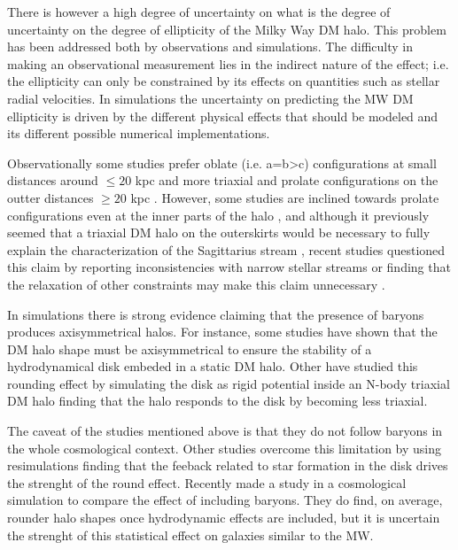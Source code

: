 \documentclass[a4paper,fleqn,usenatbib]{mnras}
\begin{document}
There is however a high degree of uncertainty on what is the degree of
uncertainty on the degree of ellipticity of the Milky Way DM halo.
This problem has been addressed both by observations and simulations.
The difficulty in making an observational measurement lies in the
indirect nature of the effect; i.e. the ellipticity can only be
constrained by its effects on quantities such as stellar radial
velocities.
In simulations the uncertainty on predicting the MW DM ellipticity is 
driven by the different physical effects that should be modeled and
its different possible numerical implementations.


Observationally some studies prefer oblate (i.e. a=b>c) configurations at small
distances around $\leq 20$ kpc
\citep[see][]{Law_and_Majewski_2010,Bovy_et_el._2016,Loebman_et_al._2012,Olling_and_Merrifield_2000,Banerjee_and_Chanda_2011} 
and more triaxial and prolate configurations on the outter distances
$\geq 20$ kpc 
\citep[see][]{Vera-Ciro_and_Helmi_2013,Law_and_Majewski_2009,Deg_and_Widrow_2013,Banerjee_and_Chanda_2011}.
However, some  studies are inclined towards prolate configurations even at the inner
parts of the halo \citep[see][]{Bowden_et_al._2016}, and
although it previously seemed that a triaxial DM halo on the
outerskirts would be necessary to fully explain the characterization
of the Sagittarius stream \citep{Law_and_Majewski_2009}, recent studies
questioned this claim by reporting inconsistencies with narrow stellar
streams \citet{Pearson_et_al._2015} or finding that
the relaxation of other constraints may make this claim unnecessary
\citet{Ibata_et_al._2013}. 

In simulations there is strong evidence claiming that the presence of
baryons produces axisymmetrical halos.  
For instance, some studies have shown that the DM halo shape must be
axisymmetrical to ensure the stability of a hydrodynamical disk
embeded in a static DM halo. 
Other have studied this rounding effect by simulating the disk as rigid
potential inside an N-body triaxial DM
halo \cite{Debattista_et_al._2008,Debattista_et_al._2013,Kazantzidis_et_al._2010}
finding that the halo responds to the disk by becoming less triaxial. 

The caveat of the studies mentioned above is that they do not
follow baryons in the whole cosmological context. 
Other studies overcome this limitation by using resimulations 
\citep{Abadi_et_al._2010,Bryan_et_al._2013} finding that the
feeback related to star formation in the disk drives the strenght of
the round effect. 
Recently \cite{2018arXiv180907255C} made a study in a cosmological
simulation to compare the effect of including baryons. They do find,
on average, rounder halo shapes once hydrodynamic effects are
included, but it is uncertain the strenght of this statistical effect
on galaxies similar to the MW.
\end{document}
